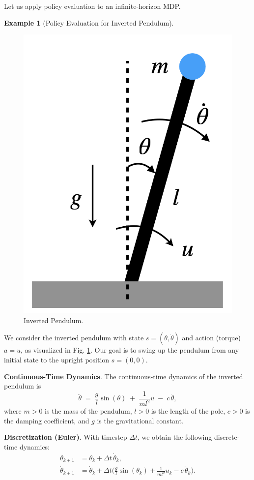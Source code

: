 \documentclass[
]{book}
\theoremstyle{definition}
\theoremstyle{definition}
\newtheorem{example}{Example}[chapter]
\theoremstyle{definition}
\theoremstyle{definition}
\theoremstyle{remark}
\begin{document}
Let us apply policy evaluation to an infinite-horizon MDP.

\begin{example}[Policy Evaluation for Inverted Pendulum]
\protect\hypertarget{exm:InfiniteHorizonMDPPolicyEvaluation}{}\label{exm:InfiniteHorizonMDPPolicyEvaluation}\leavevmode

\begin{figure}

{\centering \includegraphics[width=0.4\linewidth]{images/MDP/pendulum-drawing} 

}

\caption{Inverted Pendulum.}\label{fig:mdp-pendulum-illustration}
\end{figure}

We consider the inverted pendulum with state \(s=(\theta, \dot\theta)\) and action (torque) \(a = u\), as visualized in Fig. \ref{fig:mdp-pendulum-illustration}. Our goal is to swing up the pendulum from any initial state to the upright position \(s = (0,0)\).

\textbf{Continuous-Time Dynamics}. The continuous-time dynamics of the inverted pendulum is
\[
\ddot{\theta} \;=\; \frac{g}{l}\sin(\theta) \;+\; \frac{1}{ml^2}u \;-\; c\,\dot{\theta},
\]
where \(m > 0\) is the mass of the pendulum, \(l > 0\) is the length of the pole, \(c > 0\) is the damping coefficient, and \(g\) is the gravitational constant.

\textbf{Discretization (Euler)}. With timestep \(\Delta t\), we obtain the following discrete-time dynamics:
\begin{equation}
\begin{split}
\theta_{k+1} &= \theta_k + \Delta t \, \dot{\theta}_k, \\
\dot{\theta}_{k+1} &= \dot{\theta}_k + \Delta t
\Big(\tfrac{g}{l}\sin(\theta_k) + \tfrac{1}{ml^2}u_k - c\,\dot{\theta}_k\Big).
\end{split}
\label{eq:PendulumDynamicsDiscrete}
\end{equation}


\end{example}
\end{document}
